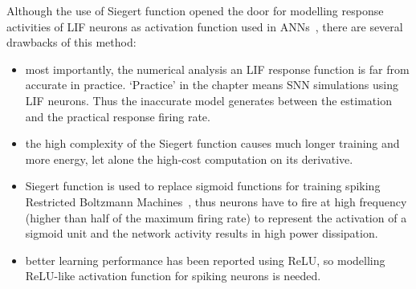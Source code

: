 	Although the use of \DIFaddbegin {}\DIFaddend Siegert function opened the door for modelling response activities of LIF neurons as \DIFaddbegin {}\DIFaddend activation function used in ANNs~\DIFdelbegin {}\DIFdelend \DIFaddbegin {}\DIFaddend , there are several drawbacks of this method:
	\begin{itemize}
		\item most importantly, the numerical analysis \DIFdelbegin {}\DIFdelend \DIFaddbegin {}\DIFaddend an LIF response function is far from accurate in practice. `Practice' in the chapter means SNN simulations using LIF neurons.
		Thus the inaccurate model generates \DIFdelbegin {}\DIFdelend \DIFaddbegin {}\DIFaddend between the estimation and the practical response firing rate.

		
		\item the high complexity of the Siegert function causes much longer training \DIFdelbegin {}\DIFdelend \DIFaddbegin {}\DIFaddend and more energy, let alone the high-cost computation on its derivative.
		\item \DIFaddbegin {}\DIFaddend Siegert function is used to replace sigmoid functions for training spiking Restricted Boltzmann Machines~\DIFdelbegin {}\DIFdelend \DIFaddbegin {}\DIFaddend , thus neurons have to fire at high frequency (higher than half of the maximum firing rate) to represent the activation of a sigmoid unit and the network activity results in high power dissipation.
		\item better learning performance has been reported using ReLU, so modelling \DIFaddbegin {}\DIFaddend ReLU-like activation function for spiking neurons is needed.  
	\end{itemize}

